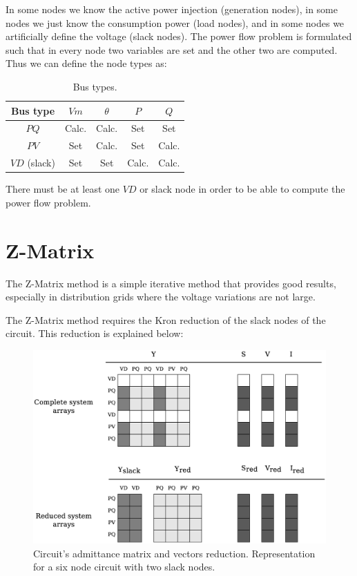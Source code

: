 \documentclass[nols,a4paper,twoside,symmetric,notoc,fleqn]{tufte-book}
\begin{document}
In some nodes we know the active power injection (generation nodes), in some nodes we just know the consumption power (load nodes), and in some nodes we artificially define the voltage (slack nodes). The power flow problem is formulated such that in every node two variables are set and the other two are computed. Thus we can define the node types as:

\begin{table}[h!]
	\begin{center}
		\begin{tabular}{ccccc}
			\toprule
			
			Bus type & $Vm$ &  $\theta$ & $P$ & $Q$\\
			
			\midrule
			
			$PQ$ & Calc. &  Calc. & Set & Set\\
			$PV$ & Set &  Calc. & Set & Calc.\\
			$VD$ (slack) & Set &  Set & Calc. & Calc.\\
			
			
			\bottomrule
		\end{tabular}
	\end{center}
	\caption{Bus types.}
	\label{bus__types}
\end{table}

There must be at least one $VD$ or slack node in order to be able to compute the power flow problem. 



\section{Z-Matrix}

The Z-Matrix method is a simple iterative method that provides good results, especially in distribution grids where the voltage variations are not large.

The Z-Matrix method requires the Kron reduction of the slack nodes of the circuit. This reduction is explained below:

\begin{figure}[h!]
  \includegraphics[width=\linewidth]{img/Matrix_reduction.eps}
  \caption{Circuit's admittance matrix and vectors reduction. Representation for a six node circuit with two slack nodes.}
  \label{fig:reduction}
\end{figure}
\end{document}

